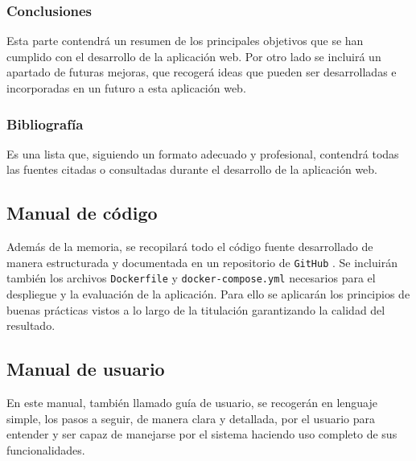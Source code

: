 \vspace{-0.1cm}

\subsubsection{Conclusiones}
Esta parte contendrá un resumen de los principales objetivos que se han cumplido con el desarrollo de la aplicación web. Por otro lado se incluirá un apartado de futuras mejoras, que recogerá ideas que pueden ser desarrolladas e incorporadas en un futuro a esta aplicación web.

\vspace{-0.1cm}

\subsubsection{Bibliografía}
Es una lista que, siguiendo un formato adecuado y profesional, contendrá todas las fuentes citadas o consultadas durante el desarrollo de la aplicación web.

\vspace{-0.15cm}

\subsection{Manual de código}
Además de la memoria, se recopilará todo el código fuente desarrollado de manera estructurada y documentada en un repositorio de \texttt{GitHub} \cite{bib:github}. Se incluirán también los archivos \texttt{Dockerfile} y \texttt{docker-compose.yml} necesarios para el despliegue y la evaluación de la aplicación. Para ello se aplicarán los principios de buenas prácticas vistos a lo largo de la titulación 
garantizando la calidad del resultado.

\vspace{-0.15cm}

\subsection{Manual de usuario}
En este manual, también llamado guía de usuario, se recogerán en lenguaje simple, los pasos a seguir, de manera clara y detallada, por el usuario para entender y ser capaz de manejarse por el sistema haciendo uso completo de sus funcionalidades.